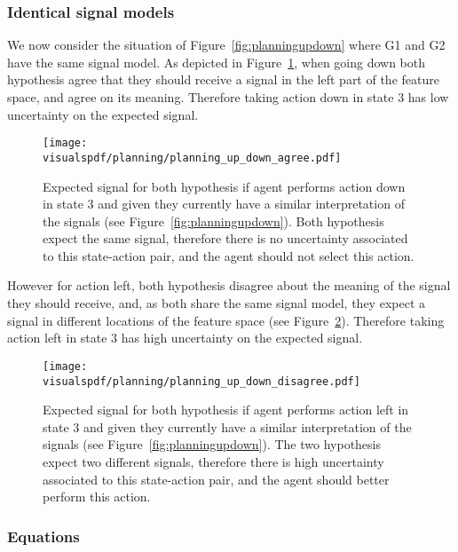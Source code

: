 \subsubsection*{Identical signal models}

We now consider the situation of Figure~\ref{fig:planningupdown} where G1 and G2 have the same signal model. As depicted in Figure~\ref{fig:uncertaintysignalupdownagree}, when going down both hypothesis agree that they should receive a signal in the left part of the feature space, and agree on its meaning. Therefore taking action down in state 3 has low uncertainty on the expected signal.

\begin{figure}[!p]
  \centering
  \texttt{[image: \\visualspdf/planning/planning\_up\_down\_agree.pdf]}
  \caption{Expected signal for both hypothesis if agent performs action down in state 3 and given they currently have a similar interpretation of the signals (see Figure~\ref{fig:planningupdown}). Both hypothesis expect the same signal, therefore there is no uncertainty associated to this state-action pair, and the agent should not select this action.}
  \label{fig:uncertaintysignalupdownagree}
\end{figure}

However for action left, both hypothesis disagree about the meaning of the signal they should receive, and, as both share the same signal model, they expect a signal in different locations of the feature space (see Figure~\ref{fig:uncertaintysignalupdowndisagree}). Therefore taking action left in state 3 has high uncertainty on the expected signal.

\begin{figure}[!p]
  \centering
  \texttt{[image: \\visualspdf/planning/planning\_up\_down\_disagree.pdf]}
  \caption{Expected signal for both hypothesis if agent performs action left in state 3 and given they currently have a similar interpretation of the signals (see Figure~\ref{fig:planningupdown}). The two hypothesis expect two different signals, therefore there is high uncertainty associated to this state-action pair, and the agent should better perform this action.}
  \label{fig:uncertaintysignalupdowndisagree}
\end{figure}


\newpage


\subsubsection*{Equations}

